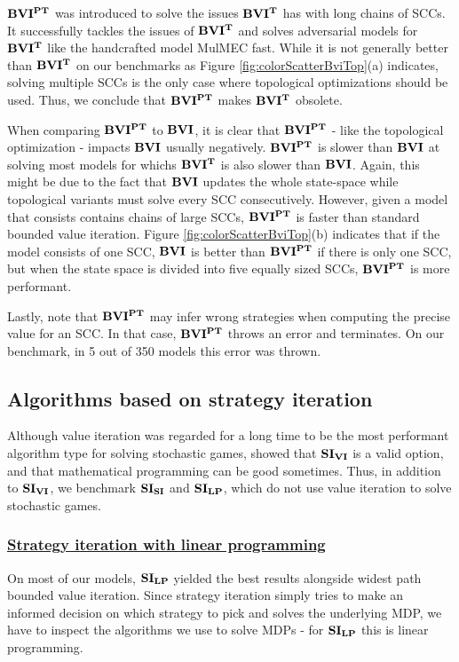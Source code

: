 $\mathbf{BVI^{PT}}$ was introduced to solve the issues $\mathbf{BVI^T}$ has with long chains of SCCs.
It successfully tackles the issues of $\mathbf{BVI^T}$ and solves adversarial models for $\mathbf{BVI^T}$ like the handcrafted model MulMEC fast.
While it is not generally better than $\mathbf{BVI^T}$ on our benchmarks as Figure \ref{fig:colorScatterBviTop}(a) indicates, 
solving multiple SCCs is the only case where topological optimizations should be used. 
Thus, we conclude that $\mathbf{BVI^{PT}}$ makes $\mathbf{BVI^T}$ obsolete.

When comparing $\mathbf{BVI^{PT}}$ to $\mathbf{BVI}$, it is clear that $\mathbf{BVI^{PT}}$ - like the topological optimization - impacts $\mathbf{BVI}$ usually negatively. 
$\mathbf{BVI^{PT}}$ is slower than $\mathbf{BVI}$ at solving most models for whichs $\mathbf{BVI^T}$ is also slower than $\mathbf{BVI}$.
Again, this might be due to the fact that $\mathbf{BVI}$ updates the whole state-space while topological variants must solve every SCC consecutively.
However, given a model that consists contains chains of large SCCs, $\mathbf{BVI^{PT}}$ is faster than standard bounded value iteration.
Figure \ref{fig:colorScatterBviTop}(b) indicates that if the model consists of one SCC, $\mathbf{BVI}$ is better than $\mathbf{BVI^{PT}}$ if there is only one SCC, 
but when the state space is divided into five equally sized SCCs, $\mathbf{BVI^{PT}}$ is more performant.

Lastly, note that $\mathbf{BVI^{PT}}$ may infer wrong strategies when computing the precise value for an SCC. 
In that case, $\mathbf{BVI^{PT}}$ throws an error and terminates. On our benchmark, in 5 out of 350 models this error was thrown.
\FloatBarrier

\subsection{Algorithms based on strategy iteration}
Although value iteration was regarded for a long time to be the most performant algorithm type for solving stochastic games, 
\cite{gandalf} showed that $\mathbf{SI_{VI}}$ is a valid option, and that mathematical programming can be good sometimes.
Thus, in addition to $\mathbf{SI_{VI}}$, we benchmark $\mathbf{SI_{SI}}$ and $\mathbf{SI_{LP}}$, which do not use value iteration to solve stochastic games.

\subsubsection*{\underline{Strategy iteration with linear programming}}
On most of our models, $\mathbf{SI_{LP}}$ yielded the best results alongside widest path bounded value iteration.
Since strategy iteration simply tries to make an informed decision on which strategy to pick and solves the underlying MDP, 
we have to inspect the algorithms we use to solve MDPs - for $\mathbf{SI_{LP}}$ this is linear programming.

